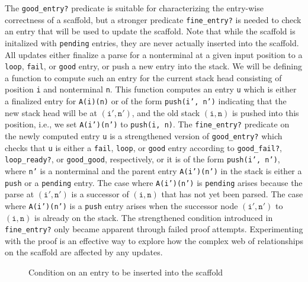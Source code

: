 \documentclass[sigplan,10pt,anonymous,review]{acmart}\settopmatter{printfolios=true,printccs=false,printacmref=false}
\newcommand{\myparagraph}[1]{}
\begin{document}
\begin{CCSXML}
\myparagraph{Updating the Scaffold.}
The \texttt{good\_entry?}  predicate is suitable for characterizing
the entry-wise correctness of a scaffold, but a
stronger predicate \texttt{fine\_entry?} is needed to check an entry that
will be used to update the scaffold.  Note that while the scaffold is initalized
with \texttt{pending} entries, they are never actually inserted into the scaffold.  All updates either finalize
a parse for a nonterminal at a given input position to a \texttt{loop},
\texttt{fail}, or \texttt{good} entry, or push a new entry into the stack.
We will be defining a function to compute such an entry for the current stack head consisting of position \texttt{i} and nonterminal \texttt{n}\@.  This function
computes an entry \texttt{u} which is either a finalized entry for
\texttt{A(i)(n)} or of the form \texttt{push(i', n')}
indicating that the new stack head will be at $(\mathtt{i'}, \mathtt{n'})$, and
the old stack $(\mathtt{i}, \mathtt{n})$ is pushed into this position, i.e., we set
\texttt{A(i')(n')} to \texttt{push(i, n)}\@.  
The \texttt{fine\_entry?} predicate on the newly computed entry \texttt{u}
is a strengthened version of  \texttt{good\_entry?} which checks that 
\texttt{u} is either a \texttt{fail}, \texttt{loop}, or
\texttt{good} entry according to \texttt{good\_fail?}, \texttt{loop\_ready?}, or \texttt{good\_good}, respectively, or it is of the form \texttt{push(i', n')}, where
\texttt{n'} is a nonterminal and the parent entry \texttt{A(i')(n')} in the stack
is either a \texttt{push} or a \texttt{pending} entry.  The case where \texttt{A(i')(n')} is \texttt{pending} arises because the parse at $(\mathtt{i', n'})$ is a successor of $(\mathtt{i, n})$ that has not yet been parsed.  The case where
\texttt{A(i')(n')} is a \texttt{push} entry arises when the successor node $(\mathtt{i', n'})$ to $(\mathtt{i, n})$ is already on the stack.  
The strengthened condition introduced in \texttt{fine\_entry?}
only became apparent through failed proof attempts.  Experimenting with the proof is an effective way to explore how the complex web of relationships on the scaffold are affected by any updates.  

\begin{figure}[h!]
  
    \vspace*{-4mm}
\caption{Condition on an entry to be inserted into the scaffold}
\label{pvs:fineentry}
\end{figure}


\end{CCSXML}
\end{document}
